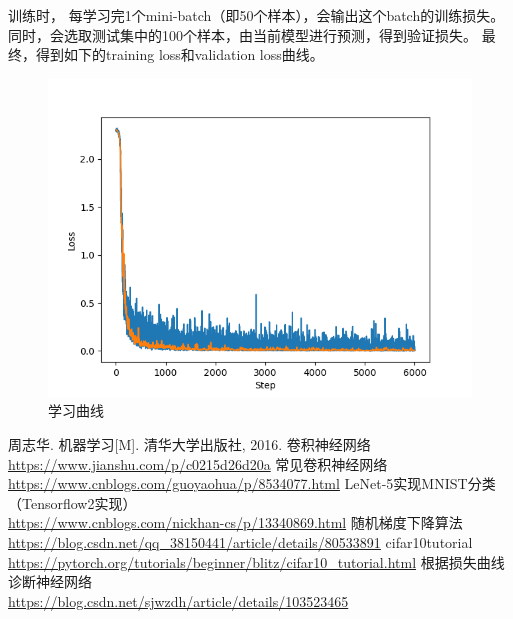 \documentclass[a4paper,utf8]{article}
\begin{document}
	训练时，
	每学习完1个mini-batch（即50个样本），会输出这个batch的训练损失。
	同时，会选取测试集中的100个样本，由当前模型进行预测，得到验证损失。
	最终，得到如下的training loss和validation loss曲线。
	\begin{figure}[H]
		\centering
		\includegraphics[scale=0.7]{p3-learning-curves.PNG}
		\caption{学习曲线}
	\end{figure}

\begin{thebibliography}{1}
 周志华. 机器学习[M]. 清华大学出版社, 2016.
 卷积神经网络\\\url{https://www.jianshu.com/p/c0215d26d20a}
 常见卷积神经网络\\\url{https://www.cnblogs.com/guoyaohua/p/8534077.html}
	LeNet-5实现MNIST分类（Tensorflow2实现）\\\url{https://www.cnblogs.com/nickhan-cs/p/13340869.html}
 随机梯度下降算法\\\url{https://blog.csdn.net/qq_38150441/article/details/80533891}
 cifar10\underline{\hspace{0.5em}}tutorial\\\url{https://pytorch.org/tutorials/beginner/blitz/cifar10_tutorial.html}
 根据损失曲线诊断神经网络\\\url{https://blog.csdn.net/sjwzdh/article/details/103523465}
\end{thebibliography}
\end{document}
